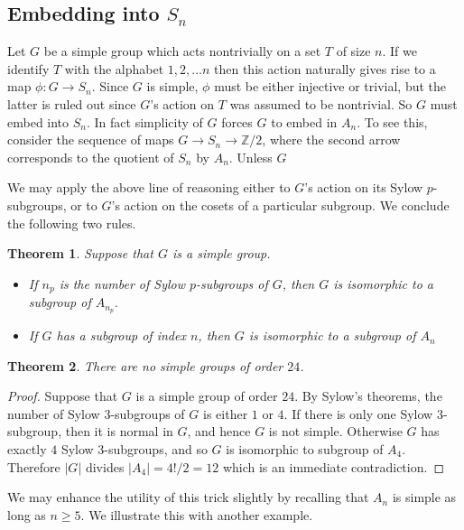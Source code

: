 \documentclass[11pt,
oneside]{article} %
\newtheorem{theorem}{Theorem}
\begin{document}

\subsection{Embedding into $S_n$}

Let $G$ be a simple group which acts nontrivially on a set $T$ of size
$n.$ If we identify $T$ with the alphabet $1,2,\ldots n$ then this
action naturally gives rise to a map $\phi: G \rightarrow S_n.$ Since
$G$ is simple, $\phi$ must be either injective or trivial, but the
latter is ruled out since $G$'s action on $T$ was assumed to be
nontrivial.  So $G$ must embed into $S_n$.  In fact simplicity of $G$
forces $G$ to embed in $A_n$.  To see this, consider the sequence of
maps $G\rightarrow S_n \rightarrow \mathbb{Z}/2$, where the second
arrow corresponds to the quotient of $S_n$ by $A_n.$ Unless $G$

We may apply the above line of reasoning either to $G$'s action on its
Sylow $p$-subgroups, or to $G$'s action on the cosets of a particular
subgroup.  We conclude the following two rules.
\begin{theorem}
Suppose that $G$ is a simple group.
\begin{itemize}
\item If $n_p$ is the number of Sylow $p$-subgroups of $G$, then $G$
  is isomorphic to a subgroup of $A_{n_p}.$
\item If $G$ has a subgroup of index $n$, then $G$ is isomorphic to a subgroup of $A_n$
\end{itemize}
\end{theorem}

\begin{theorem}
There are no simple groups of order $24$.
\end{theorem}
\begin{proof}
  Suppose that $G$ is a simple group of order $24$.  By Sylow's
  theorems, the number of Sylow $3$-subgroups of $G$ is either $1$ or
  $4$.  If there is only one Sylow $3$-subgroup, then it is normal in
  $G$, and hence $G$ is not simple.  Otherwise $G$ has exactly $4$
  Sylow $3$-subgroups, and so $G$ is isomorphic to subgroup of $A_4$.
  Therefore $|G|$ divides $|A_4| = 4!/2 = 12$ which is an immediate
  contradiction.
\end{proof}

We may enhance the utility of this trick slightly by recalling that
$A_n$ is simple as long as $n\geq 5.$ We illustrate this with another
example.
\end{document}
